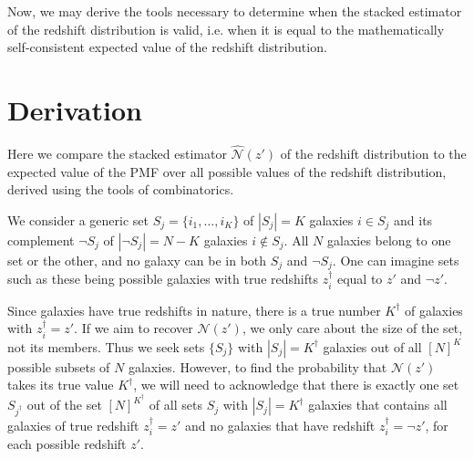 

Now, we may derive the tools necessary to determine when the stacked estimator of the redshift distribution is valid, i.e. when it is equal to the mathematically self-consistent expected value of the redshift distribution.

\section{Derivation}

Here we compare the stacked estimator $\hat{\mathcal{N}}(z')$ of the redshift distribution to the expected value of the PMF over all possible values of the redshift distribution, derived using the tools of combinatorics.

We consider a generic set ${S_{j} = \{i_{1}, \dots, i_{K}\}}$ of ${|S_{j}| = K}$ galaxies $i \in S_{j}$ and its complement 
$\lnot S_{j}$ of ${|\lnot S_{j}| = N - K}$ galaxies $i \notin S_{j}$.
All $N$ galaxies belong to one set or the other, and no galaxy can be in both $S_{j}$ and $\lnot S_{j}$.
One can imagine sets such as these being possible galaxies with true redshifts $z_{i}^{\dagger}$ equal to $z'$ and $\lnot z'$.

Since galaxies have true redshifts in nature, there is a true number $K^{\dagger}$ of galaxies with $z_{i}^{\dagger} = z'$.
If we aim to recover $\mathcal{N}(z')$, we only care about the size of the set, not its members.
Thus we seek sets $\{S_{j}\}$ with ${|S_{j}| = K^{\dagger}}$ galaxies out of all $[N]^{K}$ possible subsets of $N$ galaxies.
However, to find the probability that $\mathcal{N}(z')$ takes its true value $K^{\dagger}$, we will need to acknowledge that there is exactly one set $S_{j^{\dagger}}$ out of the set $[N]^{K^{\dagger}}$ of all sets $S_{j}$ with ${|S_{j}| = K^{\dagger}}$ galaxies that contains all galaxies of true redshift ${z_{i}^{\dagger} = z'}$ and no galaxies that have redshift ${z_{i}^{\dagger} = \lnot z'}$, for each possible redshift $z'$.

